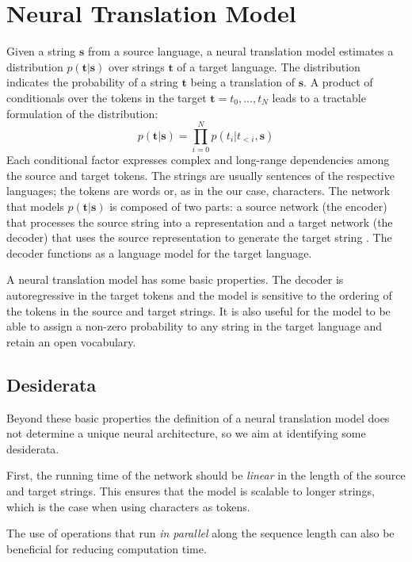\documentclass{article}
\renewcommand{\vec}{\mathbf}
\begin{document}
\section{Neural Translation Model}
\label{NTM}
Given a string $\vec{s}$ from a source language, a neural translation model estimates a distribution $p(\vec{t}|\vec{s})$ over strings $\vec{t}$ of a target language. The distribution indicates the probability of a string $\vec{t}$ being a translation of $\vec{s}$. A product of conditionals over the tokens in the target $\vec{t} = t_0,...,t_N$ leads to a tractable formulation of the distribution:
\begin{equation}
p(\vec{t} | \vec{s}) = \prod_{i=0}^{N}p(t_{i} | t_{<i},\vec{s})
\label{eq:likelihood}
\end{equation}
Each conditional factor expresses complex and long-range dependencies among the source and target tokens. The strings are usually sentences of the respective languages; the tokens are words or, as in the our case, characters.
The network that models $p(\vec{t}|\vec{s})$ is composed of two parts: a source network (the encoder) that processes the source string into a representation and a target network (the decoder) that uses the source representation to generate the target string \citep{kalchbrenner13emnlp}. The decoder  functions as a language model for the target language.


A neural translation model has some basic properties. The decoder is autoregressive in the target tokens and the model is sensitive to the ordering of the tokens in the source and target strings. It is also useful for the model to be able to assign a non-zero probability to any string in the target language and retain an open vocabulary.

\subsection{Desiderata}
\label{desiderata}

Beyond these basic properties the definition of a neural translation model does not determine a unique neural architecture, so we aim at identifying some desiderata.

First, the running time of the network should be \emph{linear} in the length of the source and target strings. 
This ensures that the model is scalable to longer strings, which is the case when using characters as tokens.

The use of operations that run \emph{in parallel} along the sequence length can also be beneficial for reducing computation time.
\end{document}
